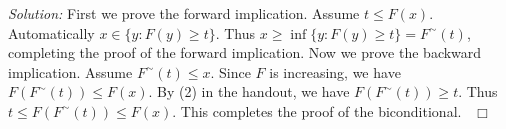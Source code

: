 \documentclass[letterpaper,10pt]{article}
\newcommand{\Ft}{F^\sim}
\begin{document}
\textit{Solution: }
First we prove the forward implication. Assume $t \leq F(x)$. Automatically $x \in \{y : F(y) \geq t\}$. Thus $x \geq \inf \{y : F(y) \geq t\} = \Ft(t)$, completing the proof of the forward implication. 
Now we prove the backward implication.  
Assume $\Ft(t) \leq x$. Since $F$ is increasing, we have $F(\Ft(t)) \leq F(x)$. 
By (2) in the handout, we have $F(\Ft(t)) \geq t$.
Thus $t \leq F(\Ft(t)) \leq F(x)$. This completes the proof of the biconditional. 
\mbox{}~\hfill $\Box$
\end{document}

